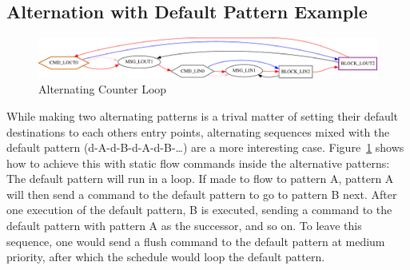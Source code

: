 \subsection{Alternation with Default Pattern Example}
%
\begin{figure}[H]
   \centering
   \def\svgwidth{1.0\textwidth}
   \includegraphics*[width=1.0\textwidth,keepaspectratio]{Figures/excntloop}
   \caption{Alternating Counter Loop}
   \label{fig:excntloop-alternate}
\end{figure}


While making two alternating patterns is a trival matter of setting their default destinations to each others entry points,
alternating sequences mixed with the default pattern (d-A-d-B-d-A-d-B-\dots) are a more interesting case.
Figure~\ref{fig:excntloop-alternate} shows how to achieve this with static flow commands inside the alternative patterns:
The default pattern will run in a loop. If made to flow to pattern A, pattern A will then send a command to the default pattern to go to pattern B next.
After one execution of the default pattern, B is executed, sending a command to the default pattern with pattern A as the successor, and so on.
To leave this sequence, one would send a flush command to the default pattern at medium priority, after which the schedule would loop the default pattern.

